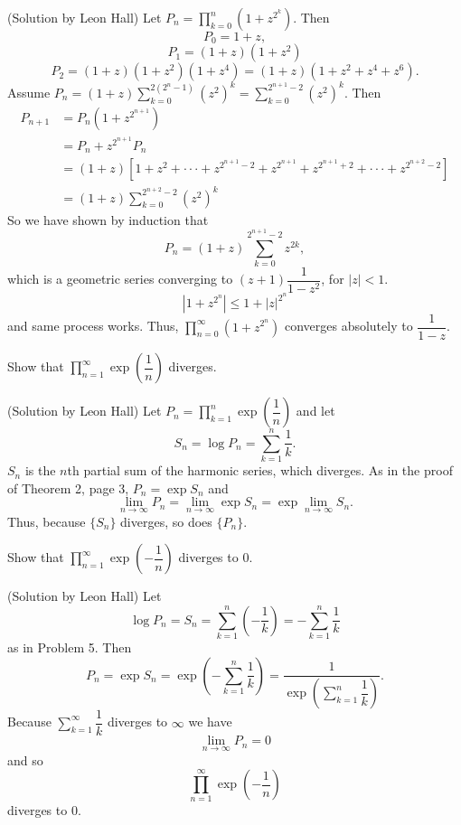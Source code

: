 \begin{solution}(Solution by Leon Hall)
Let $P_n = \displaystyle\prod_{k=0}^n (1 + z^{2^k})$. Then
$$P_0 = 1+z,$$
$$P_1 = (1+z)(1+z^2)$$
$$P_2 = (1+z)(1+z^2)(1+z^4) = (1+z)(1+z^2+z^4+z^6).$$
Assume $P_n = (1+z) \displaystyle\sum_{k=0}^{2(2^n-1)} (z^2)^k = \displaystyle\sum_{k=0}^{2^{n+1}-2} (z^2)^k.$ Then
$$\begin{array}{ll}
P_{n+1} &= P_n(1+z^{2^{n+1}} ) \\
&= P_n + z^{2^{n+1}}P_n \\
&= (1+z) \left[ 1+ z^2 + \cdot \cdot \cdot + z^{2^{n+1}-2}+z^{2^{n+1}} + z^{2^{n+1}+2} + \cdot \cdot \cdot + z^{2^{n+2}-2} \right] \\
&= (1+z) \displaystyle\sum_{k=0}^{2^{n+2}-2} (z^2)^k
\end{array}$$
So we have shown by induction that
$$P_n = (1+z) \displaystyle\sum_{k=0}^{2^{n+1}-2} z^{2k},$$
which is a geometric series converging to $(z+1) \dfrac{1}{1-z^2}$, for $|z|<1$. 
$$|1+z^{2^n}| \leq 1 + |z|^{2^n}$$
and same process works. Thus, $\displaystyle\prod_{n=0}^{\infty} (1+z^{2^n})$ converges absolutely to $\dfrac{1}{1-z}$.
\end{solution}
\begin{problem}\label{problem5chapter1}
Show that $\displaystyle\prod_{n=1}^{\infty} \exp \left( \dfrac{1}{n} \right)$ diverges.
\end{problem}
\begin{solution}(Solution by Leon Hall)
Let $P_n = \displaystyle\prod_{k=1}^n \exp \left( \dfrac{1}{n} \right)$ and let 
$$S_n = \log P_n = \displaystyle\sum_{k=1}^n \dfrac{1}{k}.$$
$S_n$ is the $n$th partial sum of the harmonic series, which diverges. As in the proof of Theorem 2, page 3, $P_n = \exp S_n$ and
$$\displaystyle\lim_{n \rightarrow \infty} P_n = \displaystyle\lim_{n \rightarrow \infty} \exp S_n = \exp \displaystyle\lim_{n \rightarrow \infty} S_n.$$
Thus, because $\{S_n\}$ diverges, so does $\{P_n \}$.
\end{solution}
\begin{problem}\label{problem6chapter1}
Show that $\displaystyle\prod_{n=1}^{\infty} \exp \left( - \dfrac{1}{n} \right)$ diverges to $0$.
\end{problem}
\begin{solution}(Solution by Leon Hall)
Let 
$$\log P_n = S_n = \displaystyle\sum_{k=1}^n \left( - \dfrac{1}{k} \right) = - \displaystyle\sum_{k=1}^n \dfrac{1}{k}$$
as in Problem 5. Then
$$P_n = \exp S_n = \exp \left( -\displaystyle\sum_{k=1}^n \dfrac{1}{k} \right) = \dfrac{1}{\exp \left( \displaystyle\sum_{k=1}^n \dfrac{1}{k} \right)}.$$
Because $\displaystyle\sum_{k=1}^{\infty} \dfrac{1}{k}$ diverges to $\infty$ we have
$$\displaystyle\lim_{n \rightarrow \infty} P_n = 0$$
and so
$$\displaystyle\prod_{n=1}^{\infty} \exp \left( - \dfrac{1}{n} \right)$$
diverges to $0$.
\end{solution}
